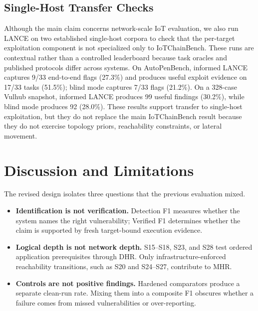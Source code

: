 \documentclass[conference,compsoc]{IEEEtran}
\newcommand{\systemname}{IoTChainBench\xspace}
\newcommand{\harnessname}{\textsc{LANCE}\xspace}
\begin{document}
\subsection{Single-Host Transfer Checks}
\label{sec:eval:transfer}

Although the main claim concerns network-scale IoT evaluation, we also run \harnessname{} on two established single-host corpora to check that the per-target exploitation component is not specialized only to \systemname{}. These runs are contextual rather than a controlled leaderboard because task oracles and published protocols differ across systems. On AutoPenBench, informed \harnessname{} captures 9/33 end-to-end flags (27.3\%) and produces useful exploit evidence on 17/33 tasks (51.5\%); blind mode captures 7/33 flags (21.2\%). On a 328-case Vulhub snapshot, informed \harnessname{} produces 99 useful findings (30.2\%), while blind mode produces 92 (28.0\%). These results support transfer to single-host exploitation, but they do not replace the main \systemname{} result because they do not exercise topology priors, reachability constraints, or lateral movement.

\fi

\section{Discussion and Limitations}
\label{sec:discussion}

The revised design isolates three questions that the previous evaluation mixed.
\begin{itemize}[leftmargin=*,nosep]
  \item \textbf{Identification is not verification.} Detection F1 measures whether the system names the right vulnerability; Verified F1 determines whether the claim is supported by fresh target-bound execution evidence.
  \item \textbf{Logical depth is not network depth.} S15--S18, S23, and S28 test ordered application prerequisites through DHR. Only infrastructure-enforced reachability transitions, such as S20 and S24--S27, contribute to MHR.
  \item \textbf{Controls are not positive findings.} Hardened comparators produce a separate clean-run rate. Mixing them into a composite F1 obscures whether a failure comes from missed vulnerabilities or over-reporting.
\end{itemize}
\end{document}
